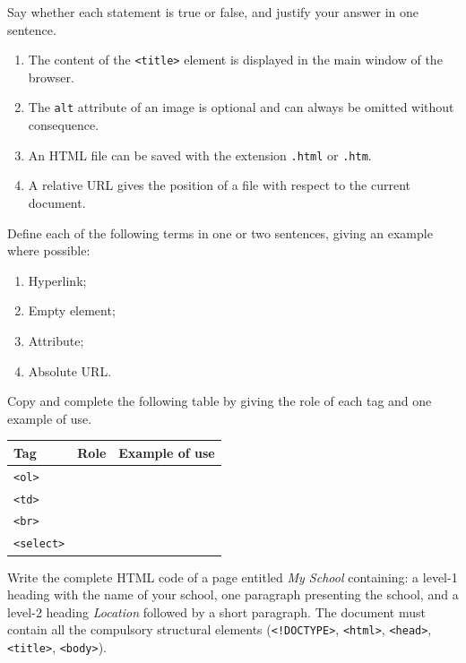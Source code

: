 \documentclass[11pt]{article}
\newcounter{popsec}
\newcounter{popsub}
\newcommand{\courssub}[1]{%
  \stepcounter{popsub}%
  \par\vspace{9pt}\noindent{\popxbold\fontsize{11.5}{13}\selectfont\color{popink}{\color{poporange}\thepopsec.\thepopsub}\hspace{6pt}#1}\par\nopagebreak\vspace{4pt}
}
\begin{document}
\begin{exercice}
Say whether each statement is true or false, and justify your answer in one sentence.
\begin{enumerate}
\item The content of the \texttt{<title>} element is displayed in the main window of the browser.
\item The \texttt{alt} attribute of an image is optional and can always be omitted without consequence.
\item An HTML file can be saved with the extension \texttt{.html} or \texttt{.htm}.
\item A relative URL gives the position of a file with respect to the current document.
\end{enumerate}
\end{exercice}

\begin{exercice}[Definitions]
Define each of the following terms in one or two sentences, giving an example where possible:
\begin{enumerate}
\item Hyperlink;
\item Empty element;
\item Attribute;
\item Absolute URL.
\end{enumerate}
\end{exercice}

\begin{exercice}
Copy and complete the following table by giving the role of each tag and one example of use.
\begin{center}
\begin{tabularx}{\linewidth}{|l|X|X|}
\hline
\rowcolor{popblueL} \textbf{Tag} & \textbf{Role} & \textbf{Example of use} \\
\hline
\texttt{<ol>} & & \\
\hline
\texttt{<td>} & & \\
\hline
\texttt{<br>} & & \\
\hline
\texttt{<select>} & & \\
\hline
\end{tabularx}
\end{center}
\end{exercice}

\courssub{I practise}

\begin{exercice}
Write the complete HTML code of a page entitled \emph{My School} containing: a level-1 heading with the name of your school, one paragraph presenting the school, and a level-2 heading \emph{Location} followed by a short paragraph. The document must contain all the compulsory structural elements (\texttt{<!DOCTYPE>}, \texttt{<html>}, \texttt{<head>}, \texttt{<title>}, \texttt{<body>}).
\end{exercice}
\end{document}
